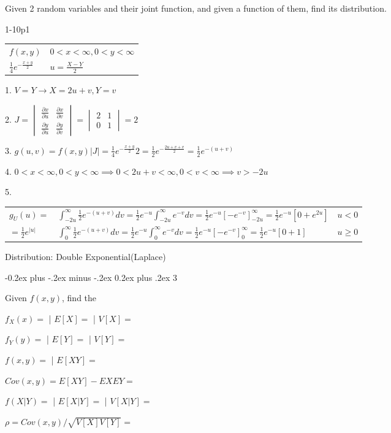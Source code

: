 \documentclass[10pt,landscape]{article}
\makeatletter
\renewcommand{\subsection}{\@startsection{subsection}{2}{0mm}%
                                {-0.2ex plus -.2ex minus -.2ex}%
                                {0.2ex plus .2ex}%
                                {\normalfont\normalsize\bfseries}}
\makeatother
\begin{document}
\begin{multicols}{1}
Given 2 random variables and their joint function, and given a function of them, find its distribution.

1-10p1

\begin{tabular}{ l|l }
$f(x,y)$ & $0<x<\infty,0<y<\infty$ \\
$\frac14e^{-\frac{x+y}2}$ & $u=\frac{X-Y}2$
\end{tabular}

1. $V=Y \to X=2u+v, Y=v$

2. $J=\begin{vmatrix}\frac{\partial x}{\partial u} & \frac{\partial x}{\partial v} \\ \frac{\partial y}{\partial u} & \frac{\partial y}{\partial v} \end{vmatrix}=\begin{vmatrix}2 & 1 \\ 0 & 1 \end{vmatrix}=2$

3. $g(u,v)=f(x,y)|J|=\frac14e^{-\frac{x+y}2}2=\frac12e^{-\frac{2u+v+v}2}=\frac12e^{-(u+v)}$

4. $0<x<\infty,0<y<\infty\implies0<2u+v<\infty,0<v<\infty\implies v>-2u$

5.
\begin{tabular}{ l|l|l }
$g_U(u)=$ & $\int_{-2u}^\infty\frac12e^{-(u+v)}dv=\frac12e^{-u}\int_{-2u}^\infty e^{-v}dv=\frac12e^{-u}\left[-e^{-v}\right]_{-2u}^\infty=\frac12e^{-u}\left[0+e^{2u}\right]$ & $u<0$ \\
$=\frac12e^{|u|}$ & $\int_{0}^\infty\frac12e^{-(u+v)}dv=\frac12e^{-u}\int_{0}^\infty e^{-v}dv=\frac12e^{-u}\left[-e^{-v}\right]_{0}^\infty=\frac12e^{-u}\left[0+1\right]$ & $u\ge0$
\end{tabular}

Distribution: Double Exponential(Laplace)


\subsection{3 }

Given $f(x,y)$, find the 

$f_X(x)=$ | $E[X]=$ | $V[X]=$ 

$f_Y(y)=$ | $E[Y]=$ | $V[Y]=$ 

$f(x,y)=$ | $E[XY]=$

$Cov(x,y)=E[XY]-EXEY=$ 

$f(X|Y)=$ | $E[X|Y]=$ | $V[X|Y]=$

$\rho= Cov(x,y)/\sqrt{V[X]V[Y]}=$


\end{multicols}
\end{document}
